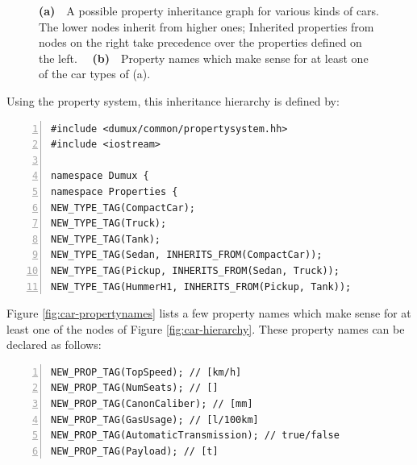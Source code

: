 \begin{figure}[t]
  \centering 
  \caption{ \textbf{(a)}~~A possible property inheritance graph for
    various kinds of cars.  The lower nodes inherit from higher ones;
    Inherited properties from nodes on the right take precedence over the
    properties defined on the left. ~~\textbf{(b)}~~Property names
    which make sense for at least one of the car types of (a).  }
\end{figure}

Using the \Dumux property system, this inheritance hierarchy is
defined by:
\begin{lstlisting}[name=propsyscars,basicstyle=\ttfamily\scriptsize,numbers=left,numberstyle=\tiny, numbersep=5pt]
#include <dumux/common/propertysystem.hh>
#include <iostream>

namespace Dumux {
namespace Properties {
NEW_TYPE_TAG(CompactCar);
NEW_TYPE_TAG(Truck);
NEW_TYPE_TAG(Tank);
NEW_TYPE_TAG(Sedan, INHERITS_FROM(CompactCar));
NEW_TYPE_TAG(Pickup, INHERITS_FROM(Sedan, Truck));
NEW_TYPE_TAG(HummerH1, INHERITS_FROM(Pickup, Tank));
\end{lstlisting}

Figure \ref{fig:car-propertynames} lists a few property names which
make sense for at least one of the nodes of Figure
\ref{fig:car-hierarchy}. These property names can be declared as
follows:
\begin{lstlisting}[name=propsyscars,basicstyle=\ttfamily\scriptsize,numbers=left,numberstyle=\tiny, numbersep=5pt]
NEW_PROP_TAG(TopSpeed); // [km/h]
NEW_PROP_TAG(NumSeats); // []
NEW_PROP_TAG(CanonCaliber); // [mm]
NEW_PROP_TAG(GasUsage); // [l/100km]
NEW_PROP_TAG(AutomaticTransmission); // true/false
NEW_PROP_TAG(Payload); // [t]
\end{lstlisting}

